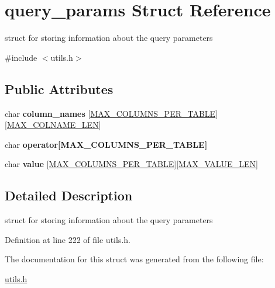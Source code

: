 \hypertarget{structquery__params}{\section{query\-\_\-params Struct Reference}
\label{structquery__params}
}


struct for storing information about the query parameters  




{\ttfamily \#include $<$utils.\-h$>$}

\subsection*{Public Attributes}
\begin{DoxyCompactItemize}
\item 
\hypertarget{structquery__params_a7a94e5322e6485a98853fd72c6852dbb}{char {\bfseries column\-\_\-names} \mbox{[}\hyperlink{storage_8h_a2c806bc7de304d1d07bb12c9d58dbdd1}{M\-A\-X\-\_\-\-C\-O\-L\-U\-M\-N\-S\-\_\-\-P\-E\-R\-\_\-\-T\-A\-B\-L\-E}\mbox{]}\mbox{[}\hyperlink{storage_8h_a5cced553ee7679aebe25952d79c7b86b}{M\-A\-X\-\_\-\-C\-O\-L\-N\-A\-M\-E\-\_\-\-L\-E\-N}\mbox{]}}\label{structquery__params_a7a94e5322e6485a98853fd72c6852dbb}

\item 
\hypertarget{structquery__params_a8b8c3e072e1b1c09bdc68590fc0bb3ca}{char {\bfseries operator\mbox{[}\-M\-A\-X\-\_\-\-C\-O\-L\-U\-M\-N\-S\-\_\-\-P\-E\-R\-\_\-\-T\-A\-B\-L\-E\mbox{]}}}\label{structquery__params_a8b8c3e072e1b1c09bdc68590fc0bb3ca}

\item 
\hypertarget{structquery__params_a97f88be0b08cbc5f7ba621811e58c8a9}{char {\bfseries value} \mbox{[}\hyperlink{storage_8h_a2c806bc7de304d1d07bb12c9d58dbdd1}{M\-A\-X\-\_\-\-C\-O\-L\-U\-M\-N\-S\-\_\-\-P\-E\-R\-\_\-\-T\-A\-B\-L\-E}\mbox{]}\mbox{[}\hyperlink{storage_8h_a00a29850f2b5b985f776f864d83e5ac3}{M\-A\-X\-\_\-\-V\-A\-L\-U\-E\-\_\-\-L\-E\-N}\mbox{]}}\label{structquery__params_a97f88be0b08cbc5f7ba621811e58c8a9}

\end{DoxyCompactItemize}


\subsection{Detailed Description}
struct for storing information about the query parameters 

Definition at line 222 of file utils.\-h.



The documentation for this struct was generated from the following file\-:\begin{DoxyCompactItemize}
\item 
\hyperlink{utils_8h}{utils.\-h}\end{DoxyCompactItemize}
